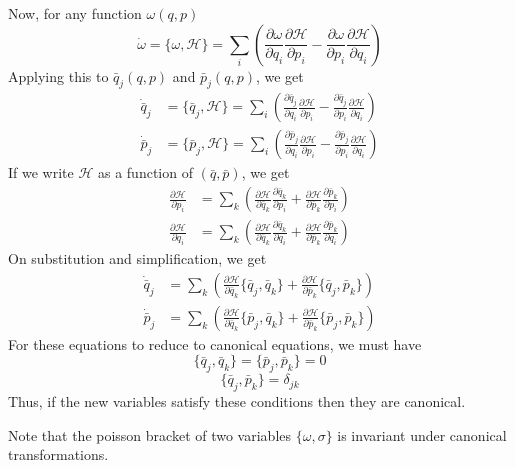 \documentclass[12pt,a4paper]{report}
\newcommand{\parder}[2]{\frac{\partial#1}{\partial#2}}
\newcommand{\hamiltonian}{\mathcal{H}}
\begin{document}
Now, for any function $\omega(q, p)$
\begin{equation*}
    \dot{\omega} = \{\omega, \hamiltonian\} = \sum_i \left( \parder{\omega}{q_i}\parder{\hamiltonian}{p_i} - \parder{\omega}{p_i}\parder{\hamiltonian}{q_i} \right)
\end{equation*}
Applying this to $\bar{q}_j(q, p)$ and $\bar{p}_j(q, p)$, we get
\begin{align*}
    \dot{\bar{q}}_j &= \{\bar{q}_j, \hamiltonian\} = \sum_i \left( \parder{\bar{q}_j}{q_i}\parder{\hamiltonian}{p_i} - \parder{\bar{q}_j}{p_i}\parder{\hamiltonian}{q_i} \right) \\
    \dot{\bar{p}}_j &= \{\bar{p}_j, \hamiltonian\} = \sum_i \left( \parder{\bar{p}_j}{q_i}\parder{\hamiltonian}{p_i} - \parder{\bar{p}_j}{p_i}\parder{\hamiltonian}{q_i} \right)
\end{align*}
If we write $\hamiltonian$ as a function of $(\bar{q}, \bar{p})$, we get
\begin{align*}
    \parder{\hamiltonian}{p_i} &= \sum_k \left( \parder{\hamiltonian}{\bar{q}_k}\parder{\bar{q}_k}{p_i} + \parder{\hamiltonian}{\bar{p}_k}\parder{\bar{p}_k}{p_i} \right) \\
    \parder{\hamiltonian}{q_i} &= \sum_k \left( \parder{\hamiltonian}{\bar{q}_k}\parder{\bar{q}_k}{q_i} + \parder{\hamiltonian}{\bar{p}_k}\parder{\bar{p}_k}{q_i} \right)
\end{align*}
On substitution and simplification, we get
\begin{align*}
    \dot{\bar{q}}_j &= \sum_k \left( \parder{\hamiltonian}{\bar{q}_k} \{\bar{q}_j, \bar{q}_k\} + \parder{\hamiltonian}{\bar{p}_k} \{\bar{q}_j, \bar{p}_k\} \right) \\
    \dot{\bar{p}}_j &= \sum_k \left( \parder{\hamiltonian}{\bar{q}_k} \{\bar{p}_j, \bar{q}_k\} + \parder{\hamiltonian}{\bar{p}_k} \{\bar{p}_j, \bar{p}_k\} \right)
\end{align*}
For these equations to reduce to canonical equations, we must have
\begin{equation*}
    \{\bar{q}_j, \bar{q}_k\} = \{\bar{p}_j, \bar{p}_k\} = 0
\end{equation*}
\begin{equation*}
    \{\bar{q}_j, \bar{p}_k\} = \delta_{jk}
\end{equation*}
Thus, if the new variables satisfy these conditions then they are canonical.

Note that the poisson bracket of two variables $\{\omega, \sigma\}$ is invariant under canonical transformations.
\end{document}
